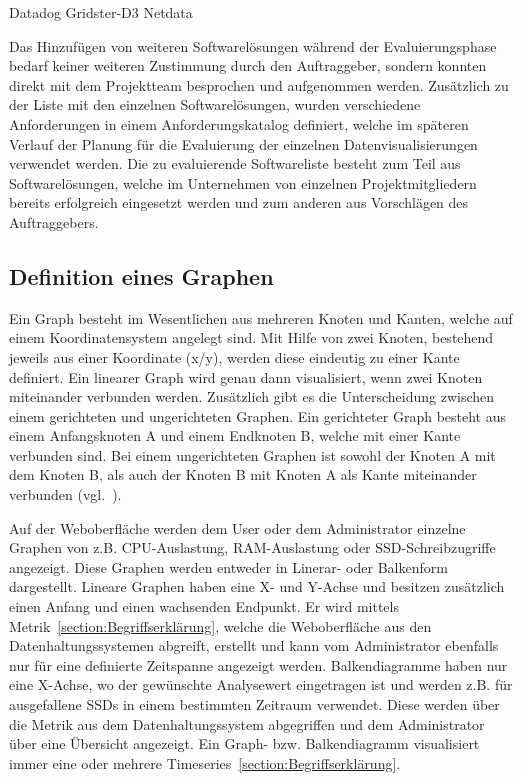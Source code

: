 \begin{outline}
  \1 Datadog
  \1 Gridster-D3
  \1 Netdata
\end{outline}

Das Hinzufügen von weiteren Softwarelösungen während der Evaluierungsphase
bedarf keiner weiteren Zustimmung durch den Auftraggeber, sondern konnten direkt
mit dem Projektteam besprochen und aufgenommen werden. Zusätzlich zu der Liste
mit den einzelnen Softwarelösungen, wurden verschiedene Anforderungen in einem
Anforderungskatalog definiert, welche im späteren Verlauf der Planung für die
Evaluierung der einzelnen Datenvisualisierungen verwendet werden. Die zu
evaluierende Softwareliste besteht zum Teil aus Softwarelösungen, welche im
Unternehmen von einzelnen Projektmitgliedern bereits erfolgreich eingesetzt
werden und zum anderen aus Vorschlägen des Auftraggebers.
\mr%

\subsection{Definition eines Graphen}
\label{definition_eines_graphen}
Ein Graph besteht im Wesentlichen aus mehreren Knoten und Kanten, welche auf
einem Koordinatensystem angelegt sind. Mit Hilfe von zwei Knoten, bestehend
jeweils aus einer Koordinate (x/y), werden diese eindeutig zu einer Kante
definiert. Ein linearer Graph wird genau dann visualisiert, wenn zwei Knoten
miteinander verbunden werden. Zusätzlich gibt es die Unterscheidung zwischen
einem gerichteten und ungerichteten Graphen. Ein gerichteter Graph besteht aus
einem Anfangsknoten A und einem Endknoten B, welche mit einer Kante verbunden
sind. Bei einem ungerichteten Graphen ist sowohl der Knoten A mit dem Knoten B,
als auch der Knoten B mit Knoten A als Kante miteinander
verbunden (vgl.~\cite{kaiser2008c}).

Auf der Weboberfläche werden dem User oder dem Administrator einzelne Graphen
von z.B. CPU-Auslastung, RAM-Auslastung oder SSD-Schreibzugriffe angezeigt.
Diese Graphen werden entweder in Linerar- oder Balkenform dargestellt. Lineare
Graphen haben eine X- und Y-Achse und besitzen zusätzlich einen Anfang und
einen wachsenden Endpunkt. Er wird mittels
Metrik~\ref{section:Begriffserklärung}, welche die Weboberfläche aus den
Datenhaltungssystemen abgreift, erstellt und kann vom Administrator ebenfalls
nur für eine definierte Zeitspanne angezeigt werden. Balkendiagramme haben nur
eine X-Achse, wo der gewünschte Analysewert eingetragen ist und werden z.B. für
ausgefallene SSDs in einem bestimmten Zeitraum verwendet. Diese werden über die
Metrik aus dem Datenhaltungssystem abgegriffen und dem Administrator über eine
Übersicht angezeigt. Ein Graph- bzw. Balkendiagramm visualisiert immer eine
oder mehrere Timeseries~\ref{section:Begriffserklärung}.

